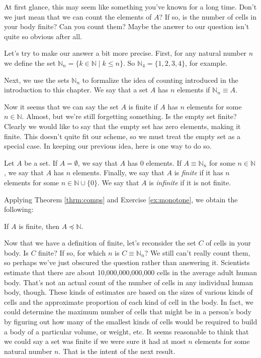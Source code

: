 At first glance, this may seem like something you've known for a long time.  Don't we just mean that we can count the elements of $A$?  If so, is the number of cells in your body finite?  Can you count them? Maybe the answer to our question isn't quite so obvious after all.

Let's try to make our answer a bit more precise.  First, for any natural number $n$ we define the set $\mathbb N_n=\{ k\in\mathbb N\mid k\leq n\}$.  So $\mathbb N_4=\{1,2,3,4\}$, for example.

Next, we use the sets $\mathbb N_n$ to formalize the idea of counting introduced in the introduction to this chapter.  We say that a set $A$ has $n$ elements if $\mathbb N_n\equiv A$.

Now it seems that we can say the set $A$ is finite if $A$ has $n$ elements for some $n\in\mathbb N$.  Almost, but we're still forgetting something.  Is the empty set finite?  Clearly we would like to say that the empty set has zero elements, making it finite.  This doesn't quite fit our scheme, so we must treat the empty set as a special case. In keeping our previous idea, here is one way to do so.

\begin{definition}
Let $A$ be a set. If $A=\emptyset$, we say that $A$ has $0$ elements. If $A\equiv \mathbb N_n$ for some $n\in\mathbb N$, we say that $A$ has $n$ elements. Finally, we
 say that $A$ is \emph{finite} if it has $n$ elements for some $n\in\mathbb N\cup \{0\}$. We say that $A$ is \emph{infinite} if it is not finite. 
\end{definition}

Applying Theorem \ref{thrm:comps} and Exercise \ref{ex:monotone}, we obtain the following:

\begin{thrm}
If $A$ is finite, then $A\preceq\mathbb N$.
\end{thrm}

Now that we have a definition of finite, let's reconsider the set $C$ of cells in your body.  Is $C$ finite?  If so, for which $n$ is $C\equiv\mathbb N_n$?  We still can't really count them, so perhaps we've just obscured the question rather than answering it.  Scientists estimate that there are about 10,000,000,000,000 cells in the average adult human body.  That's not an actual count of the number of cells in any individual human body, though. These kinds of estimates are based on the sizes of various kinds of cells and the approximate proportion of each kind of cell in the body.  In fact, we could determine the maximum number of cells that might be in a person's body by figuring out how many of the smallest kinds of cells would be required to build a body of a particular volume, or weight, etc.  It seems reasonable to think that we could say a set was finite if we were sure it had at most $n$ elements for some natural number $n$.  That is the intent of the next result.

